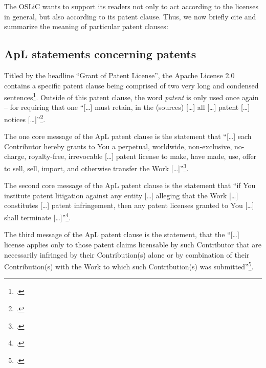 The OSLiC wants to support its readers not only to act according to the licenses
in general, but also according to its patent clause. Thus, we now briefly cite
and summarize the meaning of particular patent clauses:

\subsection{ApL statements concerning patents}\label{subsec:ApLPatentClause}

Titled by the headline \enquote{Grant of Patent License}, the Apache License 2.0
contains a specific patent clause being comprised of two very long and condensed
sentences\footcite[cf.][\nopage wp. §3]{Apl20OsiLicense2004a}. Outside of this
patent clause, the word \emph{patent} is only used once again -- for requiring
that one \enquote{[\ldots] must retain, in the (sources) [\ldots] all [\ldots]
patent [\ldots] notices [\ldots]}\footcite[cf.][\nopage wp.
§4.3]{Apl20OsiLicense2004a}.

The one core message of the ApL patent clause is the statement that
\enquote{[\ldots] each Contributor hereby grants to You a perpetual, worldwide,
non-exclusive, no-charge, royalty-free, irrevocable [\ldots] patent license to
make, have made, use, offer to sell, sell, import, and otherwise transfer the
Work [\ldots]}\footcite[cf.][\nopage wp. §3. \enquote{Contributor},
\enquote{Work} and \enquote{You} are defined §1: \emph{Contributor} refers to
the original licensor and to all others whose contributions have been
incorporated into the Work. The \emph{Work} denotes the result of the
development process regardless of its form. \emph{You} denote the
licensees.]{Apl20OsiLicense2004a}.

The second core message of the ApL patent clause is the statement that
\enquote{if You institute patent litigation against any entity [\ldots] alleging
that the Work [\ldots] constitutes [\ldots] patent infringement, then any patent
licenses granted to You [\ldots] shall terminate [\ldots]}\footcite[cf.][\nopage
wp. §3]{Apl20OsiLicense2004a}.

The third message of the ApL patent clause is the statement, that the
\enquote{[\ldots] license applies only to those patent claims licensable by such
Contributor that are necessarily infringed by their Contribution(s) alone or by
combination of their Contribution(s) with the Work to which such Contribution(s)
was submitted}\footcite[cf.][\nopage wp. §3]{Apl20OsiLicense2004a}.

